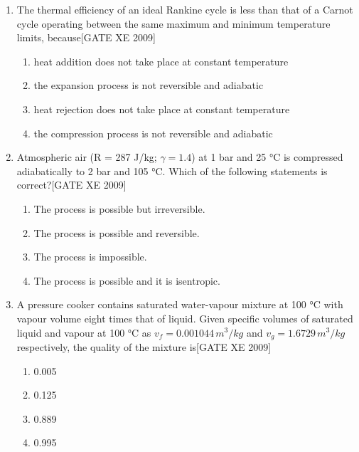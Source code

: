 \documentclass[journal,12pt,onecolumn]{IEEEtran}
\theoremstyle{remark}
\begin{document}
\begin{enumerate}
\item  The thermal efficiency of an ideal Rankine cycle is less than that of a Carnot cycle operating between the same maximum and minimum temperature limits, because\hfill[GATE XE 2009]
\begin{multicols}{2}
\begin{enumerate}
    \item heat addition does not take place at constant temperature
    \item the expansion process is not reversible and adiabatic
    \item heat rejection does not take place at constant temperature
    \item the compression process is not reversible and adiabatic
\end{enumerate}
\end{multicols}



\item Atmospheric air (R = 287 J/kg; $\gamma = 1.4$) at 1 bar and 25 °C is compressed adiabatically to 2 bar and 105 °C. Which of the following statements is correct?\hfill[GATE XE 2009]
\begin{multicols}{2}
\begin{enumerate}
    \item The process is possible but irreversible.
    \item The process is possible and reversible.
    \item The process is impossible.
    \item The process is possible and it is isentropic.
\end{enumerate}
\end{multicols}



\item A pressure cooker contains saturated water-vapour mixture at 100 °C with vapour volume eight times that of liquid. Given specific volumes of saturated liquid and vapour at 100 °C as $v_f=0.001044\,m^3/kg$ and $v_g=1.6729\,m^3/kg$ respectively, the quality of the mixture is\hfill[GATE XE 2009]
\begin{multicols}{2}
\begin{enumerate}
    \item 0.005
    \item 0.125
    \item 0.889
    \item 0.995
\end{enumerate}
\end{multicols}




\end{enumerate}
\end{document}
